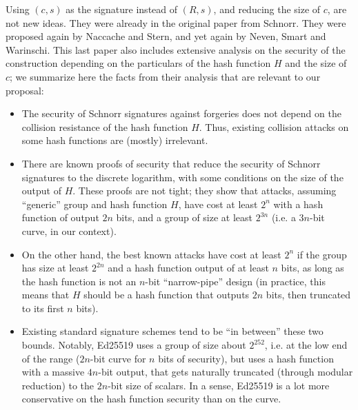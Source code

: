 \documentclass{llncs}
\begin{document}
Using $(c,s)$ as the signature instead of $(R,s)$, and reducing the size
of $c$, are not new ideas. They were already in the original paper from
Schnorr\cite{Sch1989}. They were proposed again by Naccache and
Stern\cite{NacSte2001}, and yet again by Neven, Smart and
Warinschi\cite{NevSmaWar2009}. This last paper also includes extensive
analysis on the security of the construction depending on the
particulars of the hash function $H$ and the size of $c$; we summarize
here the facts from their analysis that are relevant to our proposal:
\begin{itemize}

    \item The security of Schnorr signatures against forgeries does not
    depend on the collision resistance of the hash function $H$.
    Thus, existing collision attacks on some hash functions are (mostly)
    irrelevant.

    \item There are known proofs of security that reduce the security
    of Schnorr signatures to the discrete logarithm, with some conditions
    on the size of the output of $H$. These proofs are not tight; they
    show that attacks, assuming ``generic'' group and hash function $H$,
    have cost at least $2^n$ with a hash function of output $2n$ bits,
    and a group of size at least $2^{3n}$ (i.e. a $3n$-bit curve, in
    our context).

    \item On the other hand, the best known attacks have cost at least
    $2^n$ if the group has size at least $2^{2n}$ and a hash
    function output of at least $n$ bits, as long as the hash function
    is not an $n$-bit ``narrow-pipe'' design (in practice, this means
    that $H$ should be a hash function that outputs $2n$ bits, then
    truncated to its first $n$ bits).

    \item Existing standard signature schemes tend to be ``in between''
    these two bounds. Notably, Ed25519 uses a group of size about
    $2^{252}$, i.e. at the low end of the range ($2n$-bit curve for $n$
    bits of security), but uses a hash function with a massive $4n$-bit
    output, that gets naturally truncated (through modular reduction) to
    the $2n$-bit size of scalars. In a sense, Ed25519 is a lot more
    conservative on the hash function security than on the curve.

\end{itemize}
\end{document}
